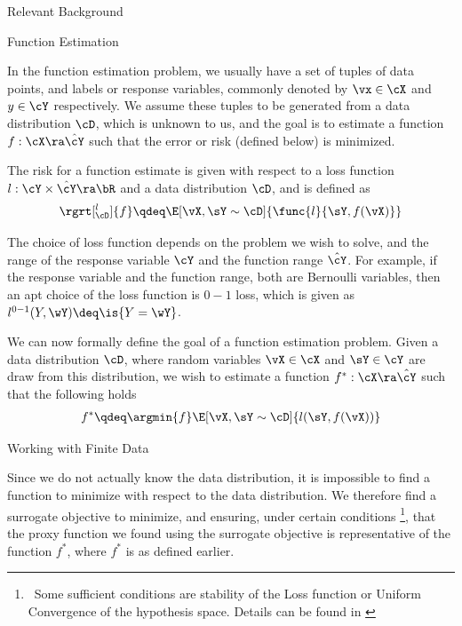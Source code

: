 \documentclass{article}
\begin{document}
\begin{psection}{Relevant Background}

	\begin{psubsection}{Function Estimation}

		In the function estimation problem, we usually have a set of tuples of data points, and labels or response variables, commonly denoted by $\vx \in \cX$ and $y \in \cY$ respectively. We assume these tuples to be generated from a data distribution $\cD$, which is unknown to us, and the goal is to estimate a function $f : \cX \ra \hat{\cY}$ such that the error or risk (defined below) is minimized.

		\begin{definition}[Risk]
			\label{def:risk}
			The risk for a function estimate is given with respect to a loss function $l : \cY \times \hat{\cY} \ra \bR$ and a data distribution $\cD$, and is defined as
			\begin{align*}
				\rgrt[_\cD^l]{f} \qdeq \E[\vX, \sY \sim \cD]{\func{l}{\sY, f(\vX)}}
			\end{align*}
		\end{definition}

		The choice of loss function depends on the problem we wish to solve, and the range of the response variable $\cY$ and the function range $\hat{\cY}$. For example, if the response variable and the function range, both are Bernoulli variables, then an apt choice of the loss function is $0-1$ loss, which is given as $l^{0-1}(Y, \wY) \deq \is{Y = \wY}$.

		We can now formally define the goal of a function estimation problem. Given a data distribution $\cD$, where random variables $\vX \in \cX$ and $\sY \in \cY$ are draw from this distribution, we wish to estimate a function $f^\ast : \cX \ra \hat{\cY}$ such that the following holds
		\begin{align*}
			f^\ast \qdeq \argmin{f} \E[\vX, \sY \sim \cD]{l(\sY, f(\vX))}
		\end{align*}

		\begin{pssubsection}{Working with Finite Data}

			Since we do not actually know the data distribution, it is impossible to find a function to minimize with respect to the data distribution. We therefore find a surrogate objective to minimize, and ensuring, under certain conditions \footnote{\ Some sufficient conditions are stability of the Loss function or Uniform Convergence of the hypothesis space. Details can be found in \cite{uml-tta}}, that the proxy function we found using the surrogate objective is representative of the function $f^\ast$, where $f^\ast$ is as defined earlier.


\end{pssubsection}
\end{psubsection}
\end{psection}
\end{document}
